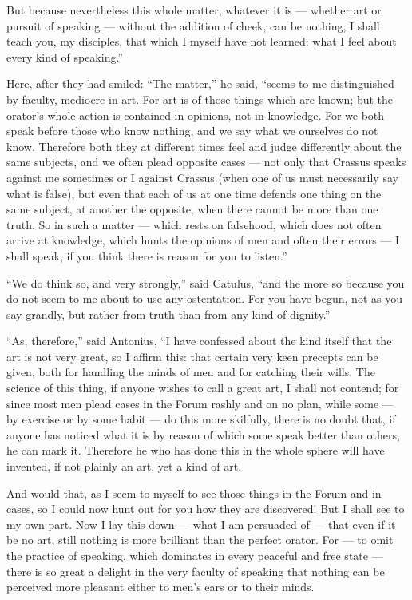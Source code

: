  But because nevertheless this whole matter, whatever it is — whether art or pursuit of speaking — without the addition of cheek, can be nothing, I shall teach you, my disciples, that which I myself have not learned: what I feel about every kind of speaking.''

 Here, after they had smiled: ``The matter,'' he said, ``seems to me distinguished by faculty, mediocre in art. For art is of those things which are known; but the orator's whole action is contained in opinions, not in knowledge. For we both speak before those who know nothing, and we say what we ourselves do not know. Therefore both they at different times feel and judge differently about the same subjects, and we often plead opposite cases — not only that Crassus speaks against me sometimes or I against Crassus (when one of us must necessarily say what is false), but even that each of us at one time defends one thing on the same subject, at another the opposite, when there cannot be more than one truth. So in such a matter — which rests on falsehood, which does not often arrive at knowledge, which hunts the opinions of men and often their errors — I shall speak, if you think there is reason for you to listen.''

 ``We do think so, and very strongly,'' said Catulus, ``and the more so because you do not seem to me about to use any ostentation. For you have begun, not as you say grandly, but rather from truth than from any kind of dignity.''

 ``As, therefore,'' said Antonius, ``I have confessed about the kind itself that the art is not very great, so I affirm this: that certain very keen precepts can be given, both for handling the minds of men and for catching their wills. The science of this thing, if anyone wishes to call a great art, I shall not contend; for since most men plead cases in the Forum rashly and on no plan, while some — by exercise or by some habit — do this more skilfully, there is no doubt that, if anyone has noticed what it is by reason of which some speak better than others, he can mark it. Therefore he who has done this in the whole sphere will have invented, if not plainly an art, yet a kind of art.

 And would that, as I seem to myself to see those things in the Forum and in cases, so I could now hunt out for you how they are discovered! But I shall see to my own part. Now I lay this down — what I am persuaded of — that even if it be no art, still nothing is more brilliant than the perfect orator. For — to omit the practice of speaking, which dominates in every peaceful and free state — there is so great a delight in the very faculty of speaking that nothing can be perceived more pleasant either to men's ears or to their minds.

